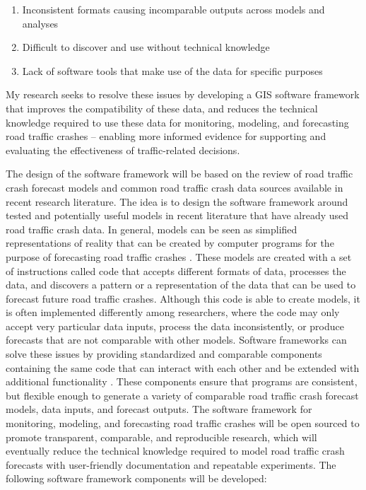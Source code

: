 \newpage

\begin{enumerate}
	\item Inconsistent formats causing incomparable outputs across models and analyses
	\item Difficult to discover and use without technical knowledge
	\item Lack of software tools that make use of the data for specific purposes
\end{enumerate}

My research seeks to resolve these issues by developing a GIS software framework that improves the compatibility of these data, and reduces the technical knowledge required to use these data for monitoring, modeling, and forecasting road traffic crashes -- enabling more informed evidence for supporting and evaluating the effectiveness of traffic-related decisions.

The design of the software framework will be based on the review of road traffic crash forecast models and common road traffic crash data sources available in recent research literature. The idea is to design the software framework around tested and potentially useful models in recent literature that have already used road traffic crash data. In general, models can be seen as simplified representations of reality that can be created by computer programs for the purpose of forecasting road traffic crashes \cite{rothenberg1989model}. These models are created with a set of instructions called code that accepts different formats of data, processes the data, and discovers a pattern or a representation of the data that can be used to forecast future road traffic crashes. Although this code is able to create models, it is often implemented differently among researchers, where the code may only accept very particular data inputs, process the data inconsistently, or produce forecasts that are not comparable with other models. Software frameworks can solve these issues by providing standardized and comparable components containing the same code that can interact with each other and be extended with additional functionality \cite{edwin2014softwareframeworks}. These components ensure that programs are consistent, but flexible enough to generate a variety of comparable road traffic crash forecast models, data inputs, and forecast outputs. The software framework for monitoring, modeling, and forecasting road traffic crashes will be open sourced to promote transparent, comparable, and reproducible research, which will eventually reduce the technical knowledge required to model road traffic crash forecasts with user-friendly documentation and repeatable experiments. The following software framework components will be developed:

